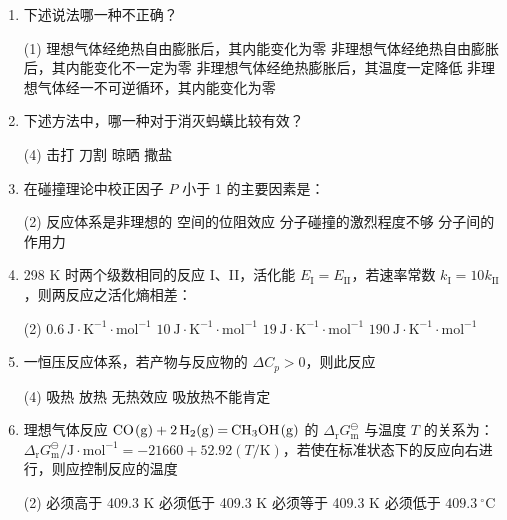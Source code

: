 \begin{enumerate}[label=\arabic*., start=1, itemsep=1.5ex]
    \item 下述说法哪一种不正确？
    \begin{tasks}(1) 
        \task 理想气体经绝热自由膨胀后，其内能变化为零
        \task 非理想气体经绝热自由膨胀后，其内能变化不一定为零
        \task 非理想气体经绝热膨胀后，其温度一定降低
        \task 非理想气体经一不可逆循环，其内能变化为零
    \end{tasks}

    \item 下述方法中，哪一种对于消灭蚂蟥比较有效？
    \begin{tasks}(4)
        \task 击打
        \task 刀割
        \task 晾晒
        \task 撒盐
    \end{tasks}

    \item 在碰撞理论中校正因子 $P$ 小于 1 的主要因素是：
    \begin{tasks}(2)
        \task 反应体系是非理想的
        \task 空间的位阻效应
        \task 分子碰撞的激烈程度不够
        \task 分子间的作用力
    \end{tasks}

    \item 298 K 时两个级数相同的反应 I、II，活化能 $E_\text{I} = E_\text{II}$，若速率常数 $k_\text{I} = 10 k_\text{II}$，则两反应之活化熵相差：
    \begin{tasks}(2)
        \task $0.6\ \text{J}\cdot\text{K}^{-1}\cdot\text{mol}^{-1}$
        \task $10\ \text{J}\cdot\text{K}^{-1}\cdot\text{mol}^{-1}$
        \task $19\ \text{J}\cdot\text{K}^{-1}\cdot\text{mol}^{-1}$
        \task $190\ \text{J}\cdot\text{K}^{-1}\cdot\text{mol}^{-1}$
    \end{tasks}

    \item 一恒压反应体系，若产物与反应物的 $\Delta C_p > 0$，则此反应
    \begin{tasks}(4)
        \task 吸热
        \task 放热
        \task 无热效应
        \task 吸放热不能肯定
    \end{tasks}

    \item 理想气体反应 $\ce{CO(g) + 2H2(g) = CH3OH(g)}$ 的 $\Delta_\text{r} G_\text{m}^\ominus$ 与温度 $T$ 的关系为：\\
    $\Delta_\text{r} G_\text{m}^\ominus / \text{J}\cdot\text{mol}^{-1} = -21660 + 52.92(T/\text{K})$，若使在标准状态下的反应向右进行，则应控制反应的温度
    \begin{tasks}(2)
        \task 必须高于 409.3 K
        \task 必须低于 409.3 K
        \task 必须等于 409.3 K
        \task 必须低于 $409.3\ ^\circ\text{C}$
    \end{tasks}


\end{enumerate}
